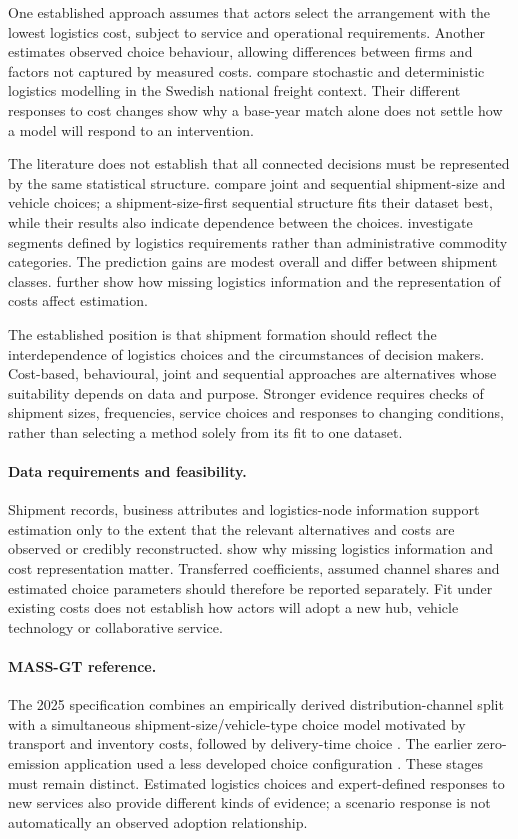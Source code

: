 One established approach assumes that actors select the arrangement with the
lowest logistics cost, subject to service and operational requirements. Another
estimates observed choice behaviour, allowing differences between firms and
factors not captured by measured costs. \Textcite{abate2019} compare stochastic
and deterministic logistics modelling in the Swedish national freight context.
Their different responses to cost changes show why a base-year match alone does
not settle how a model will respond to an intervention.

The literature does not establish that all connected decisions must be represented
by the same statistical structure. \Textcite{ahmed2023} compare joint and
sequential shipment-size and vehicle choices; a shipment-size-first sequential
structure fits their dataset best, while their results also indicate dependence
between the choices. \Textcite{piendl2022} investigate segments defined by
logistics requirements rather than administrative commodity categories. The
prediction gains are modest overall and differ between shipment classes.
\Textcite{odolinski2024} further show how missing logistics information and the
representation of costs affect estimation.

The established position is that shipment formation should reflect the
interdependence of logistics choices and the circumstances of decision makers.
Cost-based, behavioural, joint and sequential approaches are alternatives whose
suitability depends on data and purpose. Stronger evidence requires checks of
shipment sizes, frequencies, service choices and responses to changing
conditions, rather than selecting a method solely from its fit to one dataset.

\paragraph{Data requirements and feasibility.}
Shipment records, business attributes and logistics-node information support
estimation only to the extent that the relevant alternatives and costs are
observed or credibly reconstructed. \Textcite{odolinski2024} show why missing
logistics information and cost representation matter. Transferred coefficients,
assumed channel shares and estimated choice parameters should therefore be
reported separately. Fit under existing costs does not establish how actors
will adopt a new hub, vehicle technology or collaborative service.


\paragraph{MASS-GT reference.}
The 2025 specification combines an empirically derived distribution-channel
split with a simultaneous shipment-size/vehicle-type choice model motivated by
transport and inventory costs, followed by delivery-time choice
\parencite{massgt2025}. The earlier zero-emission application used a less developed
choice configuration \parencite{massgt2022}. These stages must remain distinct.
Estimated logistics choices and expert-defined responses to new services also
provide different kinds of evidence; a scenario response is not automatically
an observed adoption relationship.

